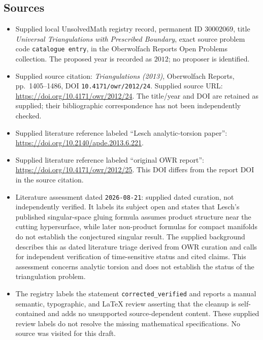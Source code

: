 \documentclass[11pt]{article}
\begin{document}
\subsection{Sources}
\begin{itemize}
\item Supplied local UnsolvedMath registry record, permanent ID \(30002069\), title \emph{Universal Triangulations with Prescribed Boundary}, exact source problem code \texttt{catalogue entry}, in the Oberwolfach Reports Open Problems collection. The proposed year is recorded as \(2012\); no proposer is identified.
\item Supplied source citation: \emph{Triangulations (2013)}, Oberwolfach Reports, pp.\ 1405--1486, DOI \texttt{10.4171/owr/2012/24}. Supplied source URL: \url{https://doi.org/10.4171/owr/2012/24}. The title/year and DOI are retained as supplied; their bibliographic correspondence has not been independently checked.
\item Supplied literature reference labeled ``Lesch analytic-torsion paper'': \url{https://doi.org/10.2140/apde.2013.6.221}.
\item Supplied literature reference labeled ``original OWR report'': \url{https://doi.org/10.4171/owr/2012/25}. This DOI differs from the report DOI in the source citation.
\item Literature assessment dated \texttt{2026-08-21}: supplied dated curation, not independently verified. It labels its subject open and states that Lesch's published singular-space gluing formula assumes product structure near the cutting hypersurface, while later non-product formulas for compact manifolds do not establish the conjectured singular result. The supplied background describes this as dated literature triage derived from OWR curation and calls for independent verification of time-sensitive status and cited claims. This assessment concerns analytic torsion and does not establish the status of the triangulation problem.
\item The registry labels the statement \texttt{corrected\_verified} and reports a manual semantic, typographic, and LaTeX review asserting that the cleanup is self-contained and adds no unsupported source-dependent content. These supplied review labels do not resolve the missing mathematical specifications. No source was visited for this draft.
\end{itemize}
\end{document}
